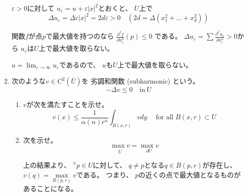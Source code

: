 \documentclass[12pt,b5paper]{ltjsarticle}
\begin{document}
\begin{enumerate}
      $\varepsilon>0$に対して
      $u_{\varepsilon}=u+\varepsilon \lvert x \rvert^{2}$とおくと、
      $U$上で
      \begin{equation}
       \Delta u_{\varepsilon}
        = \Delta \varepsilon \lvert x \rvert^{2}
        = 2d\varepsilon
        >0
        \quad
        (2d=\Delta (x_{1}^{2}+\dots +x_{d}^{2}))
      \end{equation}

      関数$f$が点$p$で最大値を持つのなら
      $\frac{\partial^{2} f}{\partial x_{i}^{2}}(p) \leq 0$
      である。
      $\Delta u_{\varepsilon} = \sum \frac{\partial^{2} u_{\varepsilon}}{\partial x_{i}^{2}} > 0$から
      $u_{\varepsilon}$は$U$上で最大値を取らない。

      $u=\lim_{\varepsilon\to\infty}u_{\varepsilon}$であるので、
      $u$も$U$上で最大値を取らない。


      \hrulefill

 \item

      次のような$v\in C^{2}(\overline{U})$を 劣調和関数 (subharmonic) という。
      \begin{equation}
       -\Delta v \leq 0 \quad \text{in}\: U
      \end{equation}


      \begin{enumerate}
       \item

            $v$が次を満たすことを示せ。
            \begin{equation}
             v(x) \leq \frac{1}{\alpha(n)r^{n}}
              \int_{B(x,r)} v dy
              \quad \; \text{for all} \; B(x,r) \subset U
            \end{equation}

            \dotfill



            \hrulefill

       \item

            次を示せ。
            \begin{equation}
             \underset{\overline{U}}{\max {v}}
              = \underset{\partial{U}}{\max {v}}
            \end{equation}

            \dotfill

            上の結果より、
            ${}^{\forall}p\in U$に対して、
            $q\ne p$となる$q\in B(p,r)$が存在し、
            $v(q) = \underset{B(p,r)}{\max} v$である。
            つまり、
            $p$の近くの点で最大値となるものがあることになる。


\end{enumerate}
\end{enumerate}
\end{document}
